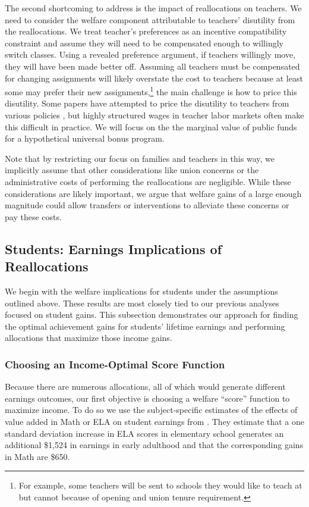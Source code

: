 \documentclass[12pt]{article}
\theoremstyle{definition}
\theoremstyle{definition}
\theoremstyle{definition}
\theoremstyle{definition}
\begin{document}
The second shortcoming to address is the impact of reallocations on teachers. We need to consider the welfare component attributable to teachers' disutility from the reallocations. We treat teacher's preferences as an incentive compatibility constraint and assume they will need to be compensated enough to willingly switch classes. Using a revealed preference argument, if teachers willingly move, they will have been made better off. Assuming all teachers must be compensated for changing assignments will likely overstate the cost to teachers because at least some may prefer their new assignments,\footnote{For example, some teachers will be sent to schools they would like to teach at but cannot because of opening and union tenure requirement.} the main challenge is how to price this disutility. Some papers have attempted to price the disutility to teachers from various policies \citep[e.g.,][]{rothstein2015teacher,bates2022teacher}, but highly structured wages in teacher labor markets often make this difficult in practice. We will focus on the the marginal value of public funds \citep[MVPF,][]{Keyser_2020} for a hypothetical universal bonus program. %


Note that by restricting our focus on families and teachers in this way, we implicitly assume that other considerations like union concerns or the administrative costs of performing the reallocations are negligible. While these considerations are likely important, we argue that welfare gains of a large enough magnitude could allow transfers or interventions to alleviate these concerns or pay these costs.


\subsection{Students: Earnings Implications of Reallocations}

We begin with the welfare implications for students under the assumptions outlined above. These results are most closely tied to our previous analyses focused on student gains. This subsection demonstrates our approach for finding the optimal achievement gains for students' lifetime earnings and performing allocations that maximize those income gains. 

\subsubsection{Choosing an Income-Optimal Score Function}
Because there are numerous allocations, all of which would generate different earnings outcomes, our first objective is choosing a welfare ``score'' function to maximize income. To do so we use the subject-specific estimates of the effects of value added in Math or ELA on student earnings from \citet{chetty2014measuring1}. They estimate that a one standard deviation increase in ELA scores in elementary school generates an additional \$1,524 in earnings in early adulthood and that the corresponding gains in Math are \$650. 
\end{document}
